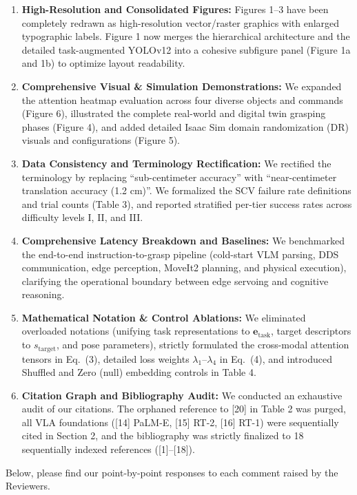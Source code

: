 \documentclass[11pt]{article}
\begin{document}
\begin{enumerate}[leftmargin=*]
    \item \textbf{High-Resolution and Consolidated Figures:} Figures 1--3 have been completely redrawn as high-resolution vector/raster graphics with enlarged typographic labels. Figure 1 now merges the hierarchical architecture and the detailed task-augmented YOLOv12 into a cohesive subfigure panel (Figure 1a and 1b) to optimize layout readability.
    \item \textbf{Comprehensive Visual \& Simulation Demonstrations:} We expanded the attention heatmap evaluation across four diverse objects and commands (Figure 6), illustrated the complete real-world and digital twin grasping phases (Figure 4), and added detailed Isaac Sim domain randomization (DR) visuals and configurations (Figure 5).
    \item \textbf{Data Consistency and Terminology Rectification:} We rectified the terminology by replacing ``sub-centimeter accuracy'' with ``near-centimeter translation accuracy (1.2 cm)''. We formalized the SCV failure rate definitions and trial counts (Table 3), and reported stratified per-tier success rates across difficulty levels I, II, and III.
    \item \textbf{Comprehensive Latency Breakdown and Baselines:} We benchmarked the end-to-end instruction-to-grasp pipeline (cold-start VLM parsing, DDS communication, edge perception, MoveIt2 planning, and physical execution), clarifying the operational boundary between edge servoing and cognitive reasoning.
    \item \textbf{Mathematical Notation \& Control Ablations:} We eliminated overloaded notations (unifying task representations to $\mathbf{e}_{\text{task}}$, target descriptors to $s_{\text{target}}$, and pose parameters), strictly formulated the cross-modal attention tensors in Eq.~(3), detailed loss weights $\lambda_1$--$\lambda_4$ in Eq.~(4), and introduced Shuffled and Zero (null) embedding controls in Table 4.
    \item \textbf{Citation Graph and Bibliography Audit:} We conducted an exhaustive audit of our citations. The orphaned reference to [20] in Table 2 was purged, all VLA foundations ([14] PaLM-E, [15] RT-2, [16] RT-1) were sequentially cited in Section 2, and the bibliography was strictly finalized to 18 sequentially indexed references ([1]--[18]).
\end{enumerate}

\noindent Below, please find our point-by-point responses to each comment raised by the Reviewers.
\end{document}
